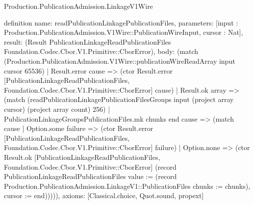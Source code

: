 \begin{lexlean}{Production.PublicationAdmission.LinkageV1Wire}
\begin{semanticmodule}
definition{
  name: readPublicationLinkagePublicationFiles,
  parameters: [input : Production.PublicationAdmission.V1Wire::PublicationWireInput, cursor : Nat],
  result: (Result PublicationLinkageReadPublicationFiles Foundation.Codec.Cbor.V1.Primitive::CborError),
  body: (match (Production.PublicationAdmission.V1Wire::publicationWireReadArray input cursor 65536)
    | Result.error cause => (ctor Result.error [PublicationLinkageReadPublicationFiles, Foundation.Codec.Cbor.V1.Primitive::CborError] cause)
    | Result.ok array => (match (readPublicationLinkagePublicationFilesGroups input (project array cursor) (project array count) 256)
      | PublicationLinkageGroupsPublicationFiles.mk chunks end cause => (match cause
        | Option.some failure => (ctor Result.error [PublicationLinkageReadPublicationFiles, Foundation.Codec.Cbor.V1.Primitive::CborError] failure)
        | Option.none => (ctor Result.ok [PublicationLinkageReadPublicationFiles, Foundation.Codec.Cbor.V1.Primitive::CborError] (record PublicationLinkageReadPublicationFiles {value := (record Production.PublicationAdmission.LinkageV1::PublicationFiles {chunks := chunks}), cursor := end}))))),
  axioms: [Classical.choice, Quot.sound, propext]
}


\end{semanticmodule}
\end{lexlean}
